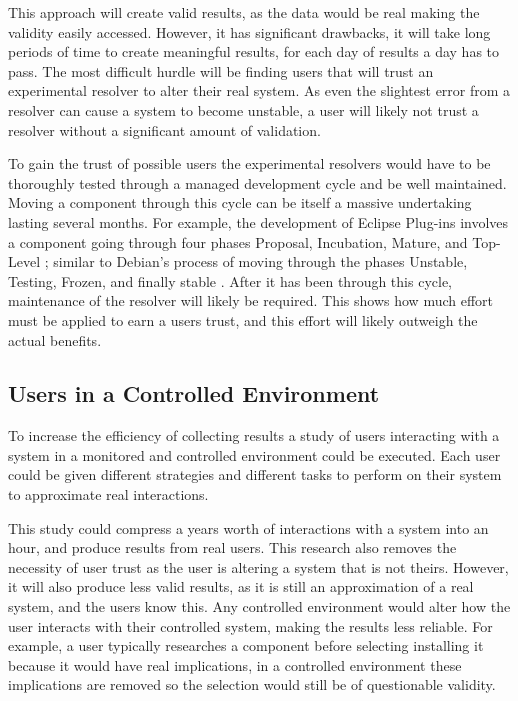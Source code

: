 This approach will create valid results, as the data would be real making the validity easily accessed. 
However, it has significant drawbacks,
it will take long periods of time to create meaningful results, for each day of results a day has to pass.
The most difficult hurdle will be finding users that will trust an experimental resolver to alter their real system.   
As even the slightest error from a resolver can cause a system to become unstable, a user will likely not trust a resolver without a significant amount of validation.

To gain the trust of possible users the experimental resolvers would have to be thoroughly tested through a managed development cycle and be well maintained.
Moving a component through this cycle can be itself a massive undertaking lasting several months. 
For example, the development of Eclipse Plug-ins involves a component going through four phases 
Proposal, Incubation, Mature, and Top-Level \citep{eclipseDevelmonetProject};
similar to Debian's process of moving through the phases Unstable, Testing, Frozen, and finally stable \citep{Barth2005}.
After it has been through this cycle, maintenance of the resolver will likely be required.
This shows how much effort must be applied to earn a users trust, and this effort will likely outweigh the actual benefits.

\subsection{Users in a Controlled Environment}
To increase the efficiency of collecting results a study of users interacting with a system in a monitored and controlled environment could be executed.
Each user could be given different strategies and different tasks to perform on their system to approximate real interactions.

This study could compress a years worth of interactions with a system into an hour, and produce results from real users. 
This research also removes the necessity of user trust as the user is altering a system that is not theirs.
However, it will also produce less valid results, as it is still an approximation of a real system, and the users know this.
Any controlled environment would alter how the user interacts with their controlled system, making the results less reliable.
For example, a user typically researches a component before selecting installing it because it would have real implications, 
in a controlled environment these implications are removed so the selection would still be of questionable validity.

